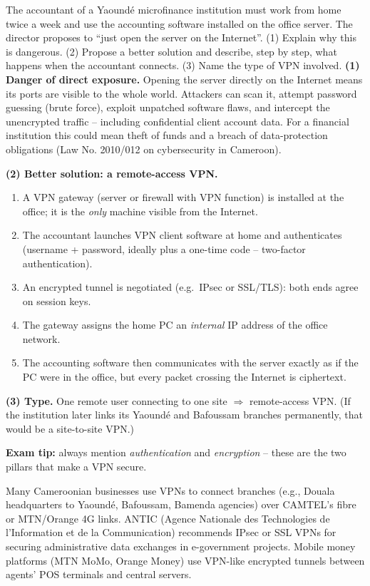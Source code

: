 \documentclass[11pt]{article}
\newcommand{\cle}[1]{{\popxbold\color{popdark}#1}}
\begin{document}
\begin{exoresolu}
The accountant of a Yaound\'e microfinance institution must work from home twice a week and use the accounting software installed on the office server. The director proposes to ``just open the server on the Internet''. (1) Explain why this is dangerous. (2) Propose a better solution and describe, step by step, what happens when the accountant connects. (3) Name the type of VPN involved.
\tcblower
\textbf{(1) Danger of direct exposure.} Opening the server directly on the Internet means its ports are visible to the whole world. Attackers can scan it, attempt password guessing (brute force), exploit unpatched software flaws, and intercept the unencrypted traffic -- including confidential client account data. For a financial institution this could mean theft of funds and a breach of data-protection obligations (Law No. 2010/012 on cybersecurity in Cameroon).

\textbf{(2) Better solution: a remote-access VPN.}
\begin{enumerate}
\item A VPN gateway (server or firewall with VPN function) is installed at the office; it is the \emph{only} machine visible from the Internet.
\item The accountant launches VPN client software at home and authenticates (username + password, ideally plus a one-time code -- two-factor authentication).
\item An encrypted tunnel is negotiated (e.g.\ IPsec or SSL/TLS): both ends agree on session keys.
\item The gateway assigns the home PC an \emph{internal} IP address of the office network.
\item The accounting software then communicates with the server exactly as if the PC were in the office, but every packet crossing the Internet is ciphertext.
\end{enumerate}
\textbf{(3) Type.} One remote user connecting to one site $\Rightarrow$ \cle{remote-access VPN}. (If the institution later links its Yaound\'e and Bafoussam branches permanently, that would be a \cle{site-to-site VPN}.)

\textbf{Exam tip:} always mention \emph{authentication} and \emph{encryption} -- these are the two pillars that make a VPN secure.
\end{exoresolu}

\begin{savaistu}
Many Cameroonian businesses use VPNs to connect branches (e.g., Douala headquarters to Yaoundé, Bafoussam, Bamenda agencies) over CAMTEL's fibre or MTN/Orange 4G links. ANTIC (Agence Nationale des Technologies de l'Information et de la Communication) recommends IPsec or SSL VPNs for securing administrative data exchanges in e-government projects. Mobile money platforms (MTN MoMo, Orange Money) use VPN-like encrypted tunnels between agents' POS terminals and central servers.
\end{savaistu}
\end{document}
